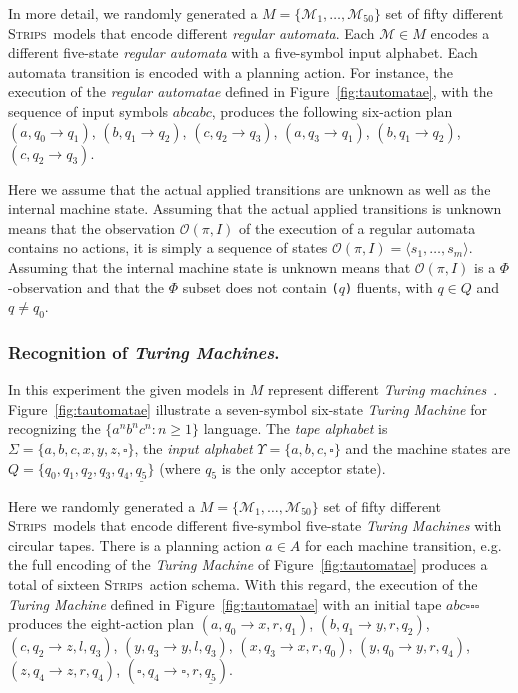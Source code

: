 \documentclass[letterpaper]{article} %
\newcommand{\tup}[1]{{\langle #1 \rangle}}
\newcommand{\strips}{\textsc{Strips}}     %
\begin{document}
In more detail, we randomly generated a $M=\{\mathcal{M}_1,\ldots,\mathcal{M}_{50}\}$ set of fifty different \strips\ models that encode different {\em regular automata}. Each $\mathcal{M}\in M$ encodes a different five-state {\em regular automata} with a five-symbol input alphabet. Each automata transition is encoded with a planning action. For instance, the execution of the {\em regular automatae} defined in Figure~\ref{fig:tautomatae}, with the sequence of input symbols $abcabc$, produces the following six-action plan {\small $(a,q_0\rightarrow q_1)$, $(b,q_1\rightarrow q_2)$, $(c,q_2\rightarrow q_3)$, $(a,q_3\rightarrow q_1)$, $(b,q_1\rightarrow q_2)$, $(c,q_2\rightarrow q_3)$}.

Here we assume that the actual applied transitions are unknown as well as the internal machine state. Assuming that the actual applied transitions is unknown means that the observation $\mathcal{O}(\pi,I)$ of the execution of a regular automata contains no actions, it is simply a sequence of states $\mathcal{O}(\pi,I)=\tup{s_1, \ldots , s_m}$. Assuming that the internal machine state is unknown means that $\mathcal{O}(\pi,I)$ is a $\Phi$-observation and that the $\Phi$ subset does not contain {\small\tt ($q$)} fluents, with $q\in Q$ and $q\neq q_0$. 

\subsubsection{Recognition of {\em Turing Machines}.} In this experiment the given models in $M$ represent different {\em Turing machines}~\cite{bylander1994computational,porco2013automatic}. Figure~\ref{fig:tautomatae} illustrate a seven-symbol six-state {\em Turing Machine} for recognizing the $\{a^nb^nc^n : n \geq 1 \}$ language. The {\em tape alphabet} is $\Sigma=\{a,b,c,x,y,z,\square\}$, the {\em input alphabet} $\Upsilon=\{a,b,c,\square\}$ and the machine states are $Q=\{q_0,q_1,q_2,q_3,q_4,\underline{q_5}\}$ (where \underline{$q_5$} is the only acceptor state).

Here we randomly generated a $M=\{\mathcal{M}_1,\ldots,\mathcal{M}_{50}\}$ set of fifty different \strips\ models that encode different five-symbol five-state {\em Turing Machines} with circular tapes. There is a planning action $a\in A$ for each machine transition, e.g. the full encoding of the {\em Turing Machine} of Figure~\ref{fig:tautomatae} produces a total of sixteen \strips\ action schema. With this regard, the execution of the {\em Turing Machine} defined in Figure~\ref{fig:tautomatae} with an initial tape $abc\square\square\square$ produces the eight-action plan {\small $(a,q_0\rightarrow x,r,q_1)$, $(b,q_1\rightarrow y,r,q_2)$, $(c,q_2\rightarrow z,l,q_3)$, $(y,q_3\rightarrow y,l,q_3)$, $(x,q_3\rightarrow x,r,q_0)$, $(y,q_0\rightarrow y,r,q_4)$, $(z,q_4\rightarrow z,r,q_4)$, $(\square,q_4\rightarrow \square,r,\underline{q_5})$}.
\end{document}
